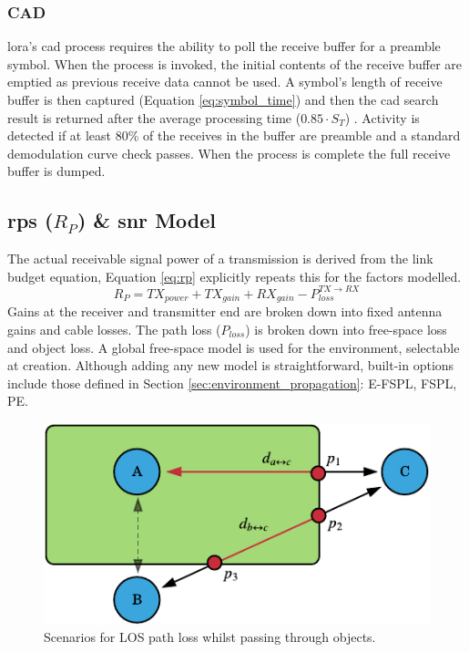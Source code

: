 \subsubsection{CAD}
\ac{lora}'s \ac{cad} process requires the ability to poll the receive buffer for a preamble symbol. When the process is invoked, the initial contents of the receive buffer are emptied as previous receive data cannot be used. A symbol's length of receive buffer is then captured (Equation \ref{eq:symbol_time}) and then the \ac{cad} search result is returned after the average processing time ($0.85\cdot S_T$) \cite{3YP:LORA_SX12}. Activity is detected if at least 80\% of the receives in the buffer are preamble and a standard demodulation curve check passes. When the process is complete the full receive buffer is dumped.

\subsection{\ac{rps} ($R_P$) \& \ac{snr} Model}
The actual receivable signal power of a transmission is derived from the link budget equation, Equation \ref{eq:rp} explicitly repeats this for the factors modelled.
\begin{equation}
\label{eq:rp}
	R_P = TX_{power} + TX_{gain} + RX_{gain} - P_{loss}^{TX\rightarrow RX}
\end{equation}
Gains at the receiver and transmitter end are broken down into fixed antenna gains and cable losses. The path loss ($P_{loss}$) is broken down into free-space loss and object loss. A global free-space model is used for the environment, selectable at creation. Although adding any new model is straightforward,  built-in options include those defined in Section \ref{sec:environment_propagation}: E-FSPL, FSPL, PE. 

\begin{figure}[H]
    \centering
   	\includegraphics{Figures/obstacle_diagram}
    \caption[Object path loss scenarios]{
    	Scenarios for LOS path loss whilst passing through objects.   
    }
    \label{fig:object_path_loss}
\end{figure}

